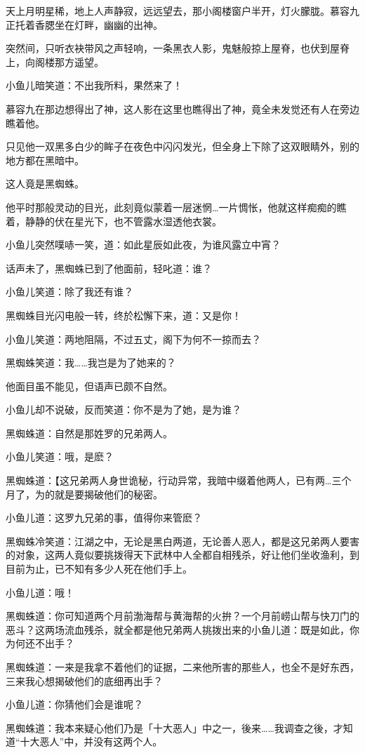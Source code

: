 \documentclass[12pt,oneside]{book}
\begin{document}
天上月明星稀，地上人声静寂，远远望去，那小阁楼窗户半开，灯火朦胧。慕容九正托着香腮坐在灯畔，幽幽的出神。

突然间，只听衣袂带风之声轻响，一条黑衣人影，鬼魅般掠上屋脊，也伏到屋脊上，向阁楼那方遥望。

小鱼儿暗笑道：不出我所料，果然来了！

慕容九在那边想得出了神，这人影在这里也瞧得出了神，竟全未发觉还有人在旁边瞧着他。

只见他一双黑多白少的眸子在夜色中闪闪发光，但全身上下除了这双眼睛外，别的地方都在黑暗中。

这人竟是黑蜘蛛。

他平时那般灵动的目光，此刻竟似蒙着一层迷惘\ldots 一片惆怅，他就这样痴痴的瞧着，静静的伏在星光下，也不管露水湿透他衣裳。

小鱼儿突然噗哧一笑，道：如此星辰如此夜，为谁风露立中宵？

话声未了，黑蜘蛛已到了他面前，轻叱道：谁？

小鱼儿笑道：除了我还有谁？

黑蜘蛛目光闪电般一转，终於松懈下来，道：又是你！

小鱼儿笑道：两地阻隔，不过五丈，阁下为何不一掠而去？

黑蜘蛛笑道：我\ldots\ldots 我岂是为了她来的？

他面目虽不能见，但语声已颇不自然。

小鱼儿却不说破，反而笑道：你不是为了她，是为谁？

黑蜘蛛道：自然是那姓罗的兄弟两人。

小鱼儿笑道：哦，是麽？

黑蜘蛛道：【这兄弟两人身世诡秘，行动异常，我暗中缀着他两人，已有两\ldots 三个月了，为的就是要揭破他们的秘密。

小鱼儿道：这罗九兄弟的事，值得你来管麽？

黑蜘蛛冷笑道：江湖之中，无论是黑白两道，无论善人恶人，都是这兄弟两人要害的对象，这两人竟似要挑拨得天下武林中人全都自相残杀，好让他们坐收渔利，到目前为止，已不知有多少人死在他们手上。

小鱼儿道：哦！

黑蜘蛛道：你可知道两个月前渤海帮与黄海帮的火拚？一个月前崂山帮与快刀门的恶斗？这两场流血残杀，就全都是他兄弟两人挑拨出来的小鱼儿道：既是如此，你为何还不出手？

黑蜘蛛道：一来是我拿不着他们的证据，二来他所害的那些人，也全不是好东西，三来我心想揭破他们的底细再出手？

小鱼儿道：你猜他们会是谁呢？

黑蜘蛛道：我本来疑心他们乃是「十大恶人」中之一，後来\ldots\ldots 我调查之後，才知道``十大恶人''中，并没有这两个人。
\end{document}
